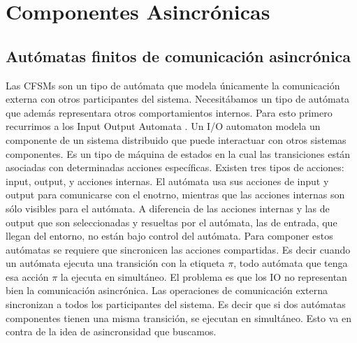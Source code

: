 

\section{Componentes Asincrónicas}


\subsection{Autómatas finitos de comunicación asincrónica}
Las CFSMs son un tipo de autómata que modela únicamente la comunicación externa con otros participantes del sistema. Necesitábamos un tipo de autómata que además representara otros comportamientos internos. Para esto primero recurrimos a los Input Output Automata \cite{lynch:cwiq-2_3}. 
Un I/O automaton modela un componente de un sistema distribuido que puede interactuar con otros sistemas componentes. Es un tipo de máquina de estados en la cual las transiciones están asociadas con determinadas acciones específicas. Existen tres tipos de acciones: input, output, y acciones internas. El autómata usa sus acciones de input y output para comunicarse con el enotrno, mientras que las acciones internas son sólo visibles para el autómata. A diferencia de las acciones internas y las de output que son seleccionadas y resueltas por el autómata, las de entrada, que llegan del entorno, no están bajo control del autómata. Para componer estos autómatas se requiere que sincronicen las acciones compartidas. Es decir cuando un autómata ejecuta una transición con la etiqueta $\pi$, todo autómata que tenga esa acción $\pi$ la ejecuta en simultáneo.
El problema es que los IO no representan bien la comunicación asincrónica. Las operaciones de comunicación externa sincronizan a todos los participantes del sistema. Es decir que si dos autómatas componentes tienen una misma transición, se ejecutan en simultáneo. Esto va en contra de la idea de asincronsidad que buscamos.

